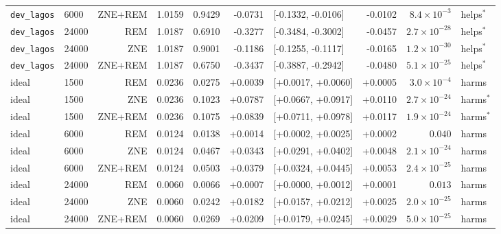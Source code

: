 \begin{tabular}{@{}llrrrrlrrl@{}}
\texttt{dev\_lagos} & 6000 & ZNE+REM & 1.0159 & 0.9429 & -0.0731 & [-0.1332, -0.0106] & -0.0102 & $8.4\times10^{-3}$ & helps$^{\ast}$ \\
\texttt{dev\_lagos} & 24000 & REM & 1.0187 & 0.6910 & -0.3277 & [-0.3484, -0.3002] & -0.0457 & $2.7\times10^{-28}$ & helps$^{\ast}$ \\
\texttt{dev\_lagos} & 24000 & ZNE & 1.0187 & 0.9001 & -0.1186 & [-0.1255, -0.1117] & -0.0165 & $1.2\times10^{-30}$ & helps$^{\ast}$ \\
\texttt{dev\_lagos} & 24000 & ZNE+REM & 1.0187 & 0.6750 & -0.3437 & [-0.3887, -0.2942] & -0.0480 & $5.1\times10^{-25}$ & helps$^{\ast}$ \\
ideal & 1500 & REM & 0.0236 & 0.0275 & +0.0039 & [+0.0017, +0.0060] & +0.0005 & $3.0\times10^{-4}$ & harms \\
ideal & 1500 & ZNE & 0.0236 & 0.1023 & +0.0787 & [+0.0667, +0.0917] & +0.0110 & $2.7\times10^{-24}$ & harms$^{\ast}$ \\
ideal & 1500 & ZNE+REM & 0.0236 & 0.1075 & +0.0839 & [+0.0711, +0.0978] & +0.0117 & $1.9\times10^{-24}$ & harms$^{\ast}$ \\
ideal & 6000 & REM & 0.0124 & 0.0138 & +0.0014 & [+0.0002, +0.0025] & +0.0002 & $0.040$ & harms \\
ideal & 6000 & ZNE & 0.0124 & 0.0467 & +0.0343 & [+0.0291, +0.0402] & +0.0048 & $2.1\times10^{-24}$ & harms \\
ideal & 6000 & ZNE+REM & 0.0124 & 0.0503 & +0.0379 & [+0.0324, +0.0445] & +0.0053 & $2.4\times10^{-25}$ & harms \\
ideal & 24000 & REM & 0.0060 & 0.0066 & +0.0007 & [+0.0000, +0.0012] & +0.0001 & $0.013$ & harms \\
ideal & 24000 & ZNE & 0.0060 & 0.0242 & +0.0182 & [+0.0157, +0.0212] & +0.0025 & $2.0\times10^{-25}$ & harms \\
ideal & 24000 & ZNE+REM & 0.0060 & 0.0269 & +0.0209 & [+0.0179, +0.0245] & +0.0029 & $5.0\times10^{-25}$ & harms \\
\bottomrule
\end{tabular}
